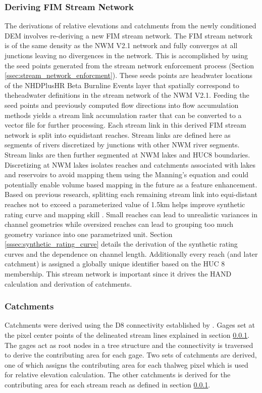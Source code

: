 \subsubsection{Deriving FIM Stream Network}
\label{sssec:deriving_fim_stream_network}
%
The derivations of relative elevations and catchments from the newly conditioned DEM involves re-deriving a new FIM stream network. 
The FIM stream network is of the same density as the NWM V2.1 network and fully converges at all junctions leaving no divergences in the network.
This is accomplished by using the seed points generated from the stream network enforcement process (Section \ref{ssec:stream_network_enforcment}).
These seeds points are headwater locations of the NHDPlusHR Beta Burnline Events layer that spatially correspond to theheadwater definitions in the stream network of the NWM V2.1.
Feeding the seed points and previously computed flow directions into flow accumulation methods \cite{wallis2009parallel,tarboton1997new,tarboton2005terrain} yields a stream link accumulation raster that can be converted to a vector file for further processing.
Each stream link in this derived FIM stream network is split into equidistant reaches.
Stream links are defined here as segments of rivers discretized by junctions with other NWM river segments.
Stream links are then further segmented at NWM lakes and HUC8 boundaries.
Discretizing at NWM lakes isolates reaches and catchments associated with lakes and reservoirs to avoid mapping them using the Manning's equation and could potentially enable volume based mapping in the future as a feature enhancement.
Based on previous research, splitting each remaining stream link into equi-distant reaches not to exceed a parameterized value of 1.5km helps improve synthetic rating curve and mapping skill \cite{garousi2019terrain,godbout2019error,zheng2018geoflood}.
Small reaches can lead to unrealistic variances in channel geometries while oversized reaches can lead to grouping too much geometry variance into one parametrized unit.
Section \ref{sssec:synthetic_rating_curve} details the derivation of the synthetic rating curves and the dependence on channel length. 
Additionally every reach (and later catchment) is assigned a globally unique identifier based on the HUC 8 membership.
This stream network is important since it drives the HAND calculation and derivation of catchments.
%
\subsubsection{Catchments}
%
Catchments were derived using the D8 connectivity established by .
Gages set at the pixel center points of the delineated stream lines explained in section \ref{sssec:deriving_fim_stream_network}.
The gages act as root nodes in a tree structure and the connectivity is traversed to derive the contributing area for each gage.
Two sets of catchments are derived, one of which assigns the contributing area for each thalweg pixel which is used for relative elevation calculation.
The other catchments is derived for the contributing area for each stream reach as defined in section \ref{sssec:deriving_fim_stream_network}. 
%
